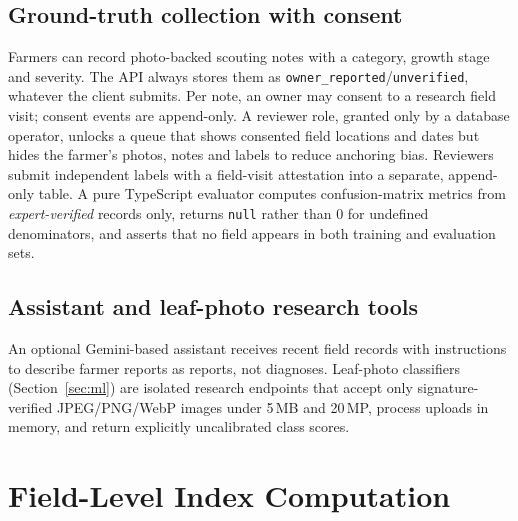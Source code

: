 \documentclass[conference]{IEEEtran}
\begin{document}
\subsection{Ground-truth collection with consent}
Farmers can record photo-backed scouting notes with a category, growth stage and severity. The API always stores them as \texttt{owner\_reported}/\texttt{unverified}, whatever the client submits. Per note, an owner may consent to a research field visit; consent events are append-only. A reviewer role, granted only by a database operator, unlocks a queue that shows consented field locations and dates but hides the farmer's photos, notes and labels to reduce anchoring bias. Reviewers submit independent labels with a field-visit attestation into a separate, append-only table. A pure TypeScript evaluator computes confusion-matrix metrics from \emph{expert-verified} records only, returns \texttt{null} rather than 0 for undefined denominators, and asserts that no field appears in both training and evaluation sets.

\subsection{Assistant and leaf-photo research tools}
An optional Gemini-based assistant receives recent field records with instructions to describe farmer reports as reports, not diagnoses. Leaf-photo classifiers (Section~\ref{sec:ml}) are isolated research endpoints that accept only signature-verified JPEG/PNG/WebP images under 5\,MB and 20\,MP, process uploads in memory, and return explicitly uncalibrated class scores.

\section{Field-Level Index Computation}\label{sec:engine}
\end{document}
